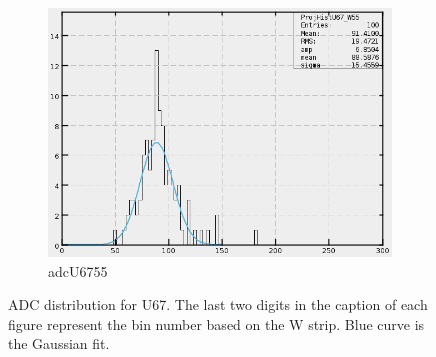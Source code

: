 \begin{figure}[h]
\begin{subfigure}[h]{0.3\textwidth}
        \includegraphics[width=\textwidth, keepaspectratio = true]{adcU67_55}
        \caption{adcU6755}
        \label{fig:adcU67_55}
    \end{subfigure}
    \caption{ADC distribution for U67. The last two digits in the caption of each figure represent the bin number based on the W strip.
    Blue curve is the Gaussian fit.}
    \label{fig:adcU4}
\end{figure}

